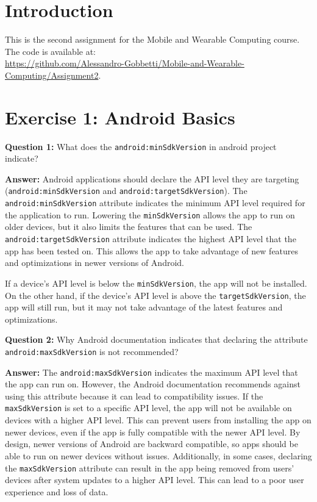 \documentclass{usireport}
\begin{document}
\maketitlepage

\section{Introduction}
This is the second assignment for the Mobile and Wearable Computing course. The code is available at: \\\url{https://github.com/Alessandro-Gobbetti/Mobile-and-Wearable-Computing/Assignment2}.

\section{Exercise 1: Android Basics}

\textbf{Question 1:} What does the \texttt{android:minSdkVersion} in android project indicate?

\textbf{Answer:} Android applications should declare the API level they are targeting (\texttt{android:minSdkVersion} and \texttt{android:targetSdkVersion}). 
The \texttt{android:minSdkVersion} attribute indicates the minimum API level required for the application to run. Lowering the \texttt{minSdkVersion} allows the app to run on older devices, but it also limits the features that can be used. 
The \texttt{android:targetSdkVersion} attribute indicates the highest API level that the app has been tested on. This allows the app to take advantage of new features and optimizations in newer versions of Android.

If a device's API level is below the \texttt{minSdkVersion}, the app will not be installed. On the other hand, if the device's API level is above the \texttt{targetSdkVersion}, the app will still run, but it may not take advantage of the latest features and optimizations.

\textbf{Question 2:} Why Android documentation indicates that declaring the attribute \texttt{android:maxSdkVersion} is not recommended?

\textbf{Answer:} The \texttt{android:maxSdkVersion} indicates the maximum API level that the app can run on. However, the Android documentation recommends against using this attribute because it can lead to compatibility issues. If the \texttt{maxSdkVersion} is set to a specific API level, the app will not be available on devices with a higher API level. This can prevent users from installing the app on newer devices, even if the app is fully compatible with the newer API level. By design, newer versions of Android are backward compatible, so apps should be able to run on newer devices without issues.
Additionally, in some cases, declaring the \texttt{maxSdkVersion} attribute can result in the app being removed from users' devices after system updates to a higher API level. This can lead to a poor user experience and loss of data.
\end{document}

